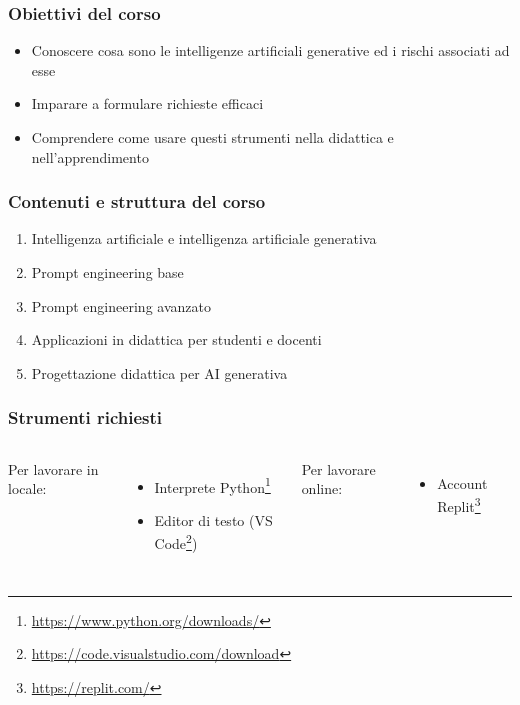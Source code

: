 
\begin{contentframe}
    \frametitle{Obiettivi del corso}

    \begin{itemize}
        \item Conoscere cosa sono le intelligenze artificiali generative ed i rischi associati ad esse
        
        \bigskip
        \item Imparare a formulare richieste efficaci

        \bigskip
        \item Comprendere come usare questi strumenti nella didattica e nell'apprendimento
    \end{itemize}
\end{contentframe}

\begin{contentframe}
    \frametitle{Contenuti e struttura del corso}

    \begin{enumerate}
        \item Intelligenza artificiale e intelligenza artificiale generativa
        \item Prompt engineering base
        \item Prompt engineering avanzato
        \item Applicazioni in didattica per studenti e docenti
        \item Progettazione didattica per AI generativa
    \end{enumerate}
\end{contentframe}

\begin{contentframe}
    \frametitle{Strumenti richiesti}

    \begin{columns}
        Per lavorare in locale:
        \begin{itemize}    
            \item Interprete Python\footnote[frame]{\url{https://www.python.org/downloads/}}
            \item Editor di testo (VS Code\footnote[frame]{\url{https://code.visualstudio.com/download}})
        \end{itemize}

        Per lavorare online:
        \begin{itemize}
            \item Account Replit\footnote[frame]{\url{https://replit.com/}}
            \bigskip
        \end{itemize}
    \end{columns}
\end{contentframe}

